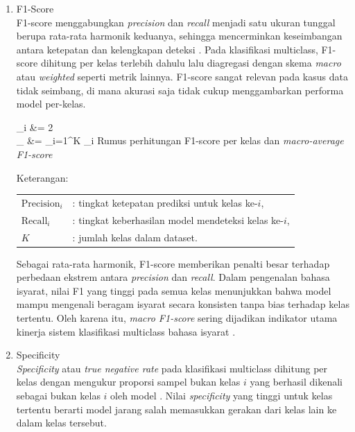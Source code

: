 \begin{enumerate}
	\item F1-Score \\
	F1-score menggabungkan \textit{precision} dan \textit{recall} menjadi satu ukuran tunggal berupa rata-rata harmonik keduanya, sehingga mencerminkan keseimbangan antara ketepatan dan kelengkapan deteksi \cite{Raschka2020}. Pada klasifikasi multiclass, F1-score dihitung per kelas terlebih dahulu lalu diagregasi dengan skema \textit{macro} atau \textit{weighted} seperti metrik lainnya. F1-score sangat relevan pada kasus data tidak seimbang, di mana akurasi saja tidak cukup menggambarkan performa model per-kelas.\par
	\vspace{0.5cm}
	\begin{equationcaptioned}[eq:2.f1]{
		_i &= 2 \times {} \\
		_{} &= \sum_{i=1}^{K} _i
	}{
		Rumus perhitungan F1-score per kelas dan \textit{macro-average F1-score}
	}\end{equationcaptioned}
	\vspace{0.5cm}

	\noindent Keterangan:

	\begin{tabular}{@{}ll}
	$\mathrm{Precision}_i$ & : tingkat ketepatan prediksi untuk kelas ke-$i$, \\
	$\mathrm{Recall}_i$ & : tingkat keberhasilan model mendeteksi kelas ke-$i$, \\
	$K$ & : jumlah kelas dalam dataset. \\
	\end{tabular}

	\vspace{0.5cm}
	Sebagai rata-rata harmonik, F1-score memberikan penalti besar terhadap perbedaan ekstrem antara \textit{precision} dan \textit{recall}. Dalam pengenalan bahasa isyarat, nilai F1 yang tinggi pada semua kelas menunjukkan bahwa model mampu mengenali beragam isyarat secara konsisten tanpa bias terhadap kelas tertentu. Oleh karena itu, \textit{macro F1-score} sering dijadikan indikator utama kinerja sistem klasifikasi multiclass bahasa isyarat \cite{Raschka2020}.\par

	\item Specificity \\
	\textit{Specificity} atau \textit{true negative rate} pada klasifikasi multiclass dihitung per kelas dengan mengukur proporsi sampel bukan kelas $i$ yang berhasil dikenali sebagai bukan kelas $i$ oleh model \cite{Raschka2020}. Nilai \textit{specificity} yang tinggi untuk kelas tertentu berarti model jarang salah memasukkan gerakan dari kelas lain ke dalam kelas tersebut.\par


\end{enumerate}
